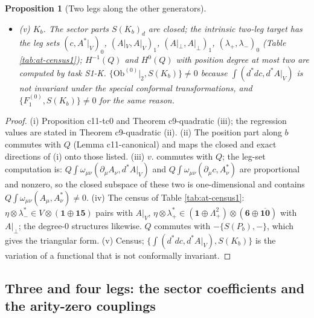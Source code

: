 \documentclass[11pt]{article}
\numberwithin{equation}{section}
\theoremstyle{plain}
\newtheorem{proposition}[theorem]{Proposition}
\theoremstyle{definition}
\newcommand{\Ap}{A|_{\perp}}
\newcommand{\AV}{A|_V}
\newcommand{\Ob}{\mathrm{Ob}}
\begin{document}
\begin{proposition}[Two legs along the other generators]
\begin{itemize}
\item (v) $K_b$. The sector parts $S(K_b)_d$ are closed; the intrinsic two-leg target has the leg sets $(c,A^*|_V)_0$, $(\AV,\AV)_1$, $(\Ap,\Ap)_1$, $(\lambda_+,\lambda_-)_0$ (Table \ref{tab:at-census1}); $H^{-1}(Q)$ and $H^0(Q)$ with position degree at most two are computed by task S1-K. $\{\Ob^{(0)}|_2,S(K_b)\}\neq0$ because $\int(d^*dc,d^*\AV)$ is not invariant under the special conformal transformations, and $\{F_1^{(0)},S(K_b)\}\neq0$ for the same reason.
\end{itemize}
\end{proposition}

\begin{proof}
(i) Proposition c11-tc0 and Theorem c9-quadratic (iii); the regression values are stated in Theorem c9-quadratic (ii). (ii) The position part along $b$ commutes with $Q$ (Lemma c11-canonical) and maps the closed and exact directions of (i) onto those listed. (iii) $v.$ commutes with $Q$; the leg-set computation is: $Q\int\omega_{\mu\nu}(\partial_\mu A_\nu,d^*\AV)$ and $Q\int\omega_{\mu\nu}(\partial_\mu c,A^*_\nu)$ are proportional and nonzero, so the closed subspace of these two is one-dimensional and contains $Q\int\omega_{\mu\nu}(A_\mu,A^*_\nu)\ne0$. (iv) The census of Table \ref{tab:at-census1}: $\eta\otimes\lambda^*_-\in V\otimes(\mathbf1\oplus\mathbf{15})$ pairs with $\AV$, $\eta\otimes\lambda^*_+\in(\mathbf1\oplus\Lambda^2_+)\otimes(\mathbf6\oplus\overline{\mathbf{10}})$ with $\Ap$; the degree-$0$ structures likewise. $Q$ commutes with $-\{S(P_b),-\}$, which gives the triangular form. (v) Census; $\{\int(d^*dc,d^*\AV),S(K_b)\}$ is the variation of a functional that is not conformally invariant.
\end{proof}

\subsection{Three and four legs: the sector coefficients and the arity-zero couplings}
\end{document}
